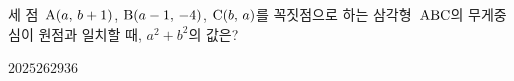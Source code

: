 세 점~$\mathrm{A}(a,\mkern3mu b+1)$, $\mathrm{B}(a-1,\mkern3mu -4)$, $\mathrm{C}(b,\mkern3mu a)$를 꼭짓점으로 하는 삼각형~$\mathrm{ABC}$의 무게중심이 원점과 일치할 때, $a^2+b^2$의 값은?
\begin{choices32}{$20$}{$25$}{$26$}{$29$}{$36$}\end{choices32}
